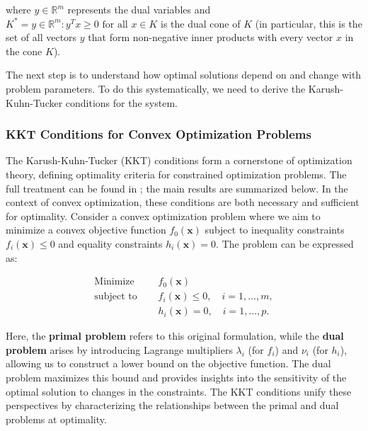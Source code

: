 \documentclass{article}
\begin{document}
where $y \in \mathbb{R}^m$ represents the dual variables and $K^* = {y \in \mathbb{R}^m : y^T x \geq 0 \text{ for all } x \in K}$ is the dual cone of $K$ (in particular, this is the set of all vectors \( y \) that form non-negative inner products with every vector \( x \) in the cone \( K \)). 

The next step is to understand how optimal solutions depend on and change with problem parameters. To do this systematically, we need to derive the Karush-Kuhn-Tucker conditions for the system. 

\subsubsection{KKT Conditions for Convex Optimization Problems}

The Karush-Kuhn-Tucker (KKT) conditions form a cornerstone of optimization theory, defining optimality criteria for constrained optimization problems. The full treatment can be found in \citep{boyd2004convex}; the main results are summarized below. In the context of convex optimization, these conditions are both necessary and sufficient for optimality. Consider a convex optimization problem where we aim to minimize a convex objective function $f_0(\mathbf{x})$ subject to inequality constraints $f_i(\mathbf{x}) \leq 0$ and equality constraints $h_i(\mathbf{x}) = 0$. The problem can be expressed as:

\begin{align*}
    \text{Minimize } & \quad f_0(\mathbf{x}) \\
    \text{subject to } & \quad f_i(\mathbf{x}) \leq 0, \quad i = 1, \dots, m, \\
    & \quad h_i(\mathbf{x}) = 0, \quad i = 1, \dots, p.
\end{align*}

Here, the \textbf{primal problem} refers to this original formulation, while the \textbf{dual problem} arises by introducing Lagrange multipliers $\lambda_i$ (for $f_i$) and $\nu_i$ (for $h_i$), allowing us to construct a lower bound on the objective function. The dual problem maximizes this bound and provides insights into the sensitivity of the optimal solution to changes in the constraints. The KKT conditions unify these perspectives by characterizing the relationships between the primal and dual problems at optimality.
\end{document}
